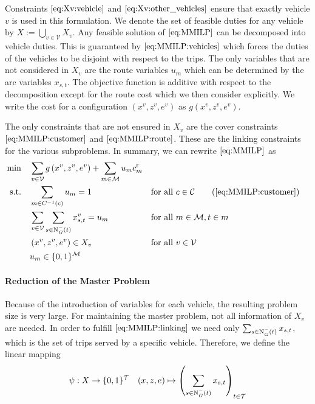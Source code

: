 Constraints $\eqref{eq:Xv:vehicle}$ and $\eqref{eq:Xv:other_vehicles}$ ensure that exactly vehicle $v$ is used in this formulation. We denote the set of feasible duties for any vehicle by $X:=\bigcup_{v\in\mathcal{V}}X_v$. Any feasible solution of $\eqref{eq:MMILP}$ can be decomposed into vehicle duties. This is guaranteed by $\eqref{eq:MMILP:vehicles}$ which forces the duties of the vehicles to be disjoint with respect to the trips. The only variables that are not considered in $X_v$ are the route variables $u_m$ which can be determined by the arc variables $x_{s,t}$. The objective function is additive with respect to the decomposition except for the route cost which we then consider explicitly. We write the cost for a configuration $\left(x^v,z^v,e^v\right)$ as $g\left(x^v,z^v,e^v\right)$.

The only constraints that are not ensured in $X_v$ are the cover constraints $\eqref{eq:MMILP:customer}$ and $\eqref{eq:MMILP:route}$. These are the linking constraints for the various subproblems. In summary, we can rewrite $\eqref{eq:MMILP}$ as
\begin{align}
	\min \quad & \sum_{v\in\mathcal{V}}g\left(x^v,z^v,e^v\right) + \sum_{m\in\mathcal{M}} u_m \croute_m \nonumber \\
	\text{s.t.} \quad & \sum_{m\in C^{-1}(c)} u_m = 1 && \text{for all } c\in\mathcal{C} \tag{\ref{eq:MMILP:customer}} \\
	& \sum_{v\in\mathcal{V}}\sum_{s\in\Nin(t)}x^v_{s,t} = u_m && \text{for all } m\in\mathcal{M},t\in m \label{eq:MMILP:linking}\\
	& \left(x^v,z^v,e^v\right)\in X_v && \text{for all } v\in\mathcal{V} \nonumber \\
	& u_m\in\{0,1\}^{\mathcal{M}} \nonumber
\end{align}

\paragraph{Reduction of the Master Problem} \parfill

Because of the introduction of variables for each vehicle, the resulting problem size is very large. For maintaining the master problem, not all information of $X_v$ are needed. In order to fulfill $\eqref{eq:MMILP:linking}$ we need only ${\sum_{s\in\operatorname{N}_G^-(t)} x_{s,t}}$, which is the set of trips served by a specific vehicle. Therefore, we define the linear mapping
\begin{align*}
	\psi:X\to\{0,1\}^{\mathcal{T}} && (x,z,e)\mapsto\left(\sum_{s\in\operatorname{N}_G^-(t)}x_{s,t}\right)_{t\in\mathcal{T}} \label{eq:psi}
\end{align*}

